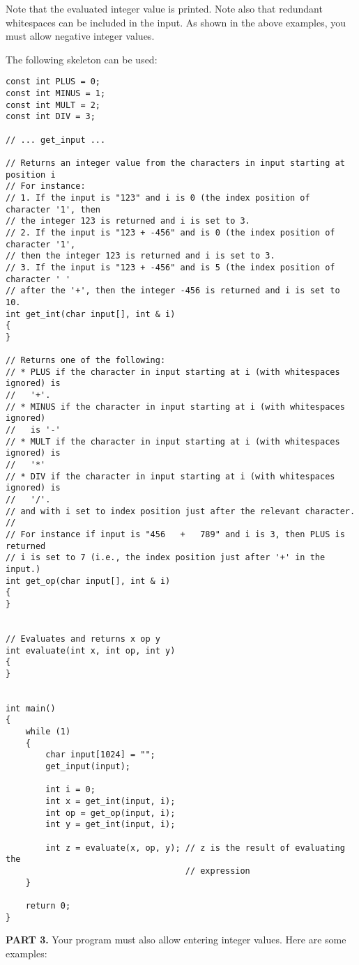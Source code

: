 Note that the evaluated integer value is printed. Note also that redundant
whitespaces can be included in the input. As shown in the above examples,
you must allow negative integer values.

The following skeleton can be used:

{\small
\begin{Verbatim}[frame=single]
const int PLUS = 0;
const int MINUS = 1;
const int MULT = 2;
const int DIV = 3;

// ... get_input ...

// Returns an integer value from the characters in input starting at position i
// For instance:
// 1. If the input is "123" and i is 0 (the index position of character '1', then 
// the integer 123 is returned and i is set to 3.
// 2. If the input is "123 + -456" and is 0 (the index position of character '1', 
// then the integer 123 is returned and i is set to 3.
// 3. If the input is "123 + -456" and is 5 (the index position of character ' ' 
// after the '+', then the integer -456 is returned and i is set to 10.
int get_int(char input[], int & i)
{
}

// Returns one of the following:
// * PLUS if the character in input starting at i (with whitespaces ignored) is
//   '+'.
// * MINUS if the character in input starting at i (with whitespaces ignored)
//   is '-'
// * MULT if the character in input starting at i (with whitespaces ignored) is
//   '*'
// * DIV if the character in input starting at i (with whitespaces ignored) is
//   '/'.
// and with i set to index position just after the relevant character.
//
// For instance if input is "456   +   789" and i is 3, then PLUS is returned
// i is set to 7 (i.e., the index position just after '+' in the input.)
int get_op(char input[], int & i)
{
}


// Evaluates and returns x op y 
int evaluate(int x, int op, int y)
{
}


int main()
{
    while (1)
    {
        char input[1024] = "";
        get_input(input);

        int i = 0;
        int x = get_int(input, i);
        int op = get_op(input, i);
        int y = get_int(input, i);
        
        int z = evaluate(x, op, y); // z is the result of evaluating the
                                    // expression
    }

    return 0;
}
\end{Verbatim}
}

\textbf{PART 3.} Your program must also allow entering integer values.
Here are some examples:

